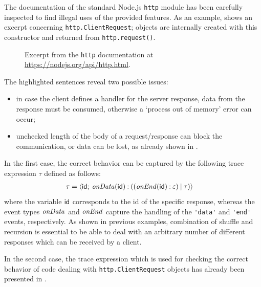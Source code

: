 The documentation of the standard Node.js \lstinline{http} module has been carefully inspected to find illegal uses
of the provided features.
As an example,  shows an excerpt concerning \lstinline{http.ClientRequest};
objects are internally created with this constructor and returned from \lstinline{http.request()}.
\begin{figure}
	\caption{Excerpt from the \lstinline{http} documentation at \url{https://nodejs.org/api/http.html}.}
	\label{fig:httpDoc}
\end{figure}
The highlighted sentences reveal two possible issues:
\begin{itemize}
\item in case the client defines a handler for the server response, data from the response must be consumed,
  otherwise a `process out of memory' error can occur;
\item unchecked length of the body of a request/response can block the communication, or data can be lost, as already shown
  in .
\end{itemize}
In the first case, the correct behavior can be captured by the following trace expression $\tau$ defined as follows:
\begin{align*}
\tau &= {\langle}\mathsf{id};\:{\mathit{onData}(\mathsf{id}) \mathbin{:} ((\mathit{onEnd}(\mathsf{id}) \mathbin{:} \varepsilon) \mathbin{|} \tau)}{\rangle}
\end{align*}
where the variable $\mathsf{id}$ corresponds to the id of the specific response, whereas the event types
$\mathit{onData}$ and $\mathit{onEnd}$ capture the handling of the \lstinline{'data'} and \lstinline{'end'} events, respectively.
As shown in previous examples, combination of shuffle and recursion is essential to be able to deal with
an arbitrary number of different responses which can be received by a client.

In the second case, the trace expression which is used for checking the correct behavior of code dealing with
\lstinline{http.ClientRequest} objects has already been presented in .

